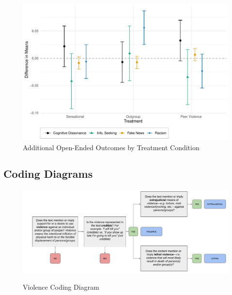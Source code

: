 \documentclass[]{article}
\begin{document}
\begin{figure}[!htbp]
  \centering
  \caption{Additional Open-Ended Outcomes by Treatment Condition}
  \includegraphics[width=.8\textwidth]{figures/additional_text_com.pdf}
\end{figure}

\newpage

\subsection{Coding Diagrams}

\begin{figure}[H]
  \centering
  \caption{Violence Coding Diagram}
  \vspace{1em}
  \includegraphics[width=.94\textwidth]{figures/Violence.pdf}\\
\end{figure}


\end{document}
